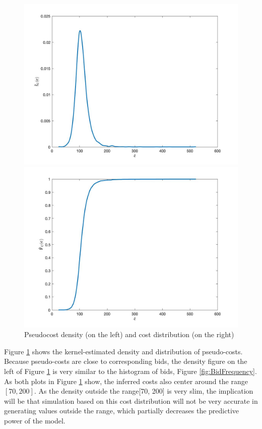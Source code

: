 \documentclass[11pt]{article}
\begin{document}
\begin{figure}
\centering
    \begin{minipage}[h]{0.5\textwidth}
        \centering
        \includegraphics[width=1\linewidth]{costDensity.jpg}
    \end{minipage}%
    \begin{minipage}[h]{0.5\textwidth}
        \centering
        \includegraphics[width=1\linewidth]{costDistribution.jpg}
    \end{minipage}
\caption{Pseudocost density (on the left) and cost distribution (on the right)}
\label{fig:CostEstimation}
\end{figure}

Figure \ref{fig:CostEstimation} shows the kernel-estimated density and 
distribution of pseudo-costs. Because pseudo-costs are close to corresponding 
bids, the density figure on the left of Figure \ref{fig:CostEstimation} is very 
similar to the histogram of bids, Figure \ref{fig:BidFrequency}. As both plots in 
Figure \ref{fig:CostEstimation} show, the inferred costs also center around 
the range $[70, 200]$. As the density outside the range[70, 200] is very slim, 
the implication will be that simulation based on this cost distribution will not 
be very accurate in generating values outside the range, which partially 
decreases the predictive power of the model. 
\end{document}
